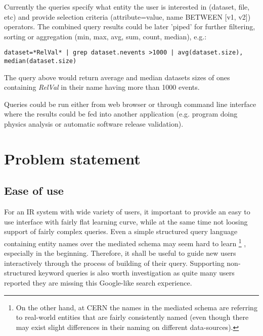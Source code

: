 \documentclass[a4paper,11pt,draft]{article}
\begin{document}
Currently the queries specify what entity the user is interested in (dataset, file, etc) and provide selection criteria (attribute=value, name BETWEEN [v1, v2]) operators. The combined query results could be later 'piped' for further filtering, sorting or aggregation (min, max, avg, sum, count, median), e.g.:

{\small 
\begin{verbatim}
dataset=*RelVal* | grep dataset.nevents >1000 | avg(dataset.size), median(dataset.size)
\end{verbatim}
}

The query above would return average and median datasets sizes  of ones containing  \textit{RelVal} in their name having more than 1000 events.

Queries could be run either from web browser or through  command line interface where the results could  be fed into another application (e.g. program doing physics analysis or automatic software release validation).



\section{Problem statement}




\subsection{Ease of use}

For an IR system with wide variety of users, it important to provide an easy to use interface with fairly flat learning curve, while at the same time not loosing support of fairly complex queries.
%
	Even a simple structured query language containing entity names over the mediated schema may seem hard to learn%
	\footnote{On the other hand, at CERN the names in  the mediated schema are referring to real-world entities that {\color{red}are fairly consistently named} (even though there may exist slight differences in their naming on different data-sources).}%
	, especially in the beginning. Therefore, it shall be useful to guide new users interactively through the process of building of their query.
%   
   Supporting non-structured keyword queries is also worth investigation as quite many users reported they are missing this Google-like search experience.
        
\end{document}
